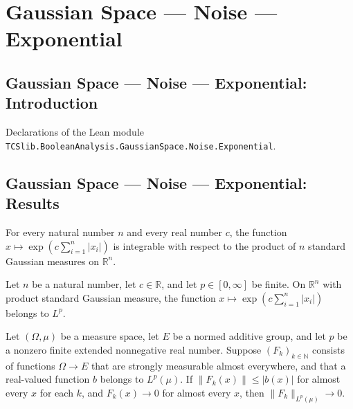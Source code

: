 \section{Gaussian Space --- Noise --- Exponential}
\subsection*{Gaussian Space --- Noise --- Exponential: Introduction}

Declarations of the Lean module \texttt{TCSlib.BooleanAnalysis.GaussianSpace.Noise.Exponential}.

\subsection*{Gaussian Space --- Noise --- Exponential: Results}

\begin{lemma}
\label{BooleanAnalysis.GaussianSpace.integrable_exp_sum_abs_gaussian}
\leanok
{}
For every natural number $n$ and every real number $c$, the function
$x\mapsto\exp\!\left(c\sum_{i=1}^n |x_i|\right)$ is integrable with respect to the
product of $n$ standard Gaussian measures on $\mathbb R^n$.
\end{lemma}

\begin{lemma}
\label{BooleanAnalysis.GaussianSpace.memLp_exp_sum_abs_gaussian}
\leanok
{}
Let $n$ be a natural number, let $c\in\mathbb R$, and let $p\in[0,\infty]$ be finite. On
$\mathbb R^n$ with product standard Gaussian measure, the function $x\mapsto
\exp\!\left(c\sum_{i=1}^n |x_i|\right)$ belongs to $L^p$.
\end{lemma}

\begin{lemma}
\label{BooleanAnalysis.GaussianSpace.tendsto_eLpNorm_zero_of_dominated}
\leanok
{}
Let $(\Omega,\mu)$ be a measure space, let $E$ be a normed additive group, and let $p$
be a nonzero finite extended nonnegative real number. Suppose $(F_k)_{k\in\mathbb N}$
consists of functions $\Omega\to E$ that are strongly measurable almost everywhere, and
that a real-valued function $b$ belongs to $L^p(\mu)$. If $\|F_k(x)\|\le |b(x)|$ for
almost every $x$ for each $k$, and $F_k(x)\to0$ for almost every $x$, then
$\|F_k\|_{L^p(\mu)}\to0$.
\end{lemma}

